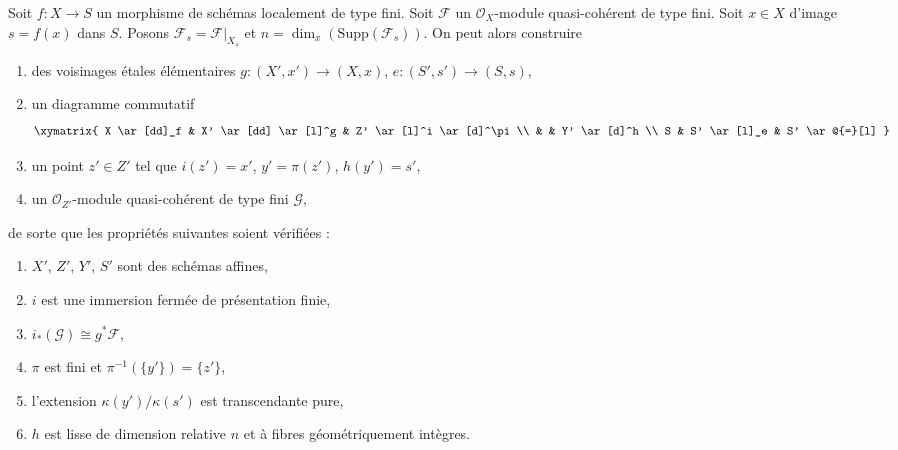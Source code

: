 \begin{lemma}
\label{lemma-elementary-devissage}
Soit $f : X \to S$ un morphisme de schémas localement de type fini.
Soit $\mathcal{F}$ un $\mathcal{O}_X$-module quasi-cohérent de type fini.
Soit $x \in X$ d'image $s = f(x)$ dans $S$.
Posons $\mathcal{F}_s = \mathcal{F}|_{X_s}$ et
$n = \dim_x(\text{Supp}(\mathcal{F}_s))$.
On peut alors construire
\begin{enumerate}
\item des voisinages \'etales élémentaires $g : (X', x') \to (X, x)$,
$e : (S', s') \to (S, s)$,
\item un diagramme commutatif
$$
\xymatrix{
X \ar[dd]_f & X' \ar[dd] \ar[l]^g & Z' \ar[l]^i \ar[d]^\pi \\
& & Y' \ar[d]^h \\
S & S' \ar[l]_e & S' \ar@{=}[l]
}
$$
\item un point $z' \in Z'$ tel que $i(z') = x'$, $y' = \pi(z')$, $h(y') = s'$,
\item un $\mathcal{O}_{Z'}$-module quasi-cohérent de type fini $\mathcal{G}$,
\end{enumerate}
de sorte que les propriétés suivantes soient vérifiées :
\begin{enumerate}
\item $X'$, $Z'$, $Y'$, $S'$ sont des schémas affines,
\item $i$ est une immersion fermée de présentation finie,
\item $i_*(\mathcal{G}) \cong g^*\mathcal{F}$,
\item $\pi$ est fini et $\pi^{-1}(\{y'\}) = \{z'\}$,
\item l'extension $\kappa(y')/\kappa(s')$ est transcendante pure,
\item $h$ est lisse de dimension relative $n$
et à fibres géométriquement intègres.
\end{enumerate}
\end{lemma}

